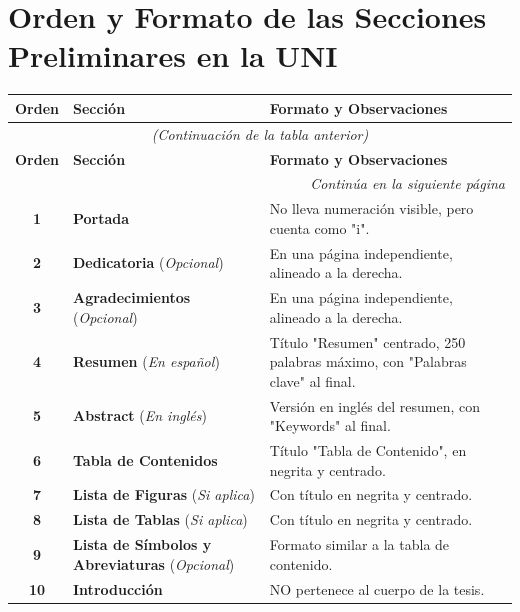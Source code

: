 \documentclass{report}
\newcommand{\greencheck}{{\color{green}\ding{51}}} %
\begin{document}
\section*{\color{red}Orden y Formato de las Secciones Preliminares en la UNI \greencheck}

\begin{longtable}{|c|l|p{8cm}|}
    \hline
    \textbf{Orden} & \textbf{Sección} & \textbf{Formato y Observaciones} \\ \hline
    \endfirsthead

    \multicolumn{3}{c}{{\textit{(Continuación de la tabla anterior)}}} \\ \hline
    \textbf{Orden} & \textbf{Sección} & \textbf{Formato y Observaciones} \\ \hline
    \endhead

    \hline \multicolumn{3}{|r|}{{\textit{Continúa en la siguiente página}}} \\ \hline
    \endfoot

    \hline
    \endlastfoot

    \textbf{1} & \textbf{Portada} & No lleva numeración visible, pero cuenta como "i". \\ \hline

    \textbf{2} & \textbf{Dedicatoria} (\textit{Opcional}) & En una página independiente, alineado a la derecha. \\ \hline

    \textbf{3} & \textbf{Agradecimientos} (\textit{Opcional}) & En una página independiente, alineado a la derecha. \\ \hline

    \textbf{4} & \textbf{Resumen} (\textit{En español}) & Título "Resumen" centrado, 250 palabras máximo, con "Palabras clave" al final. \\ \hline

    \textbf{5} & \textbf{Abstract} (\textit{En inglés}) & Versión en inglés del resumen, con "Keywords" al final. \\ \hline

    \textbf{6} & \textbf{Tabla de Contenidos} & Título "Tabla de Contenido", en negrita y centrado. \\ \hline

    \textbf{7} & \textbf{Lista de Figuras} (\textit{Si aplica}) & Con título en negrita y centrado. \\ \hline

    \textbf{8} & \textbf{Lista de Tablas} (\textit{Si aplica}) & Con título en negrita y centrado. \\ \hline

    \textbf{9} & \textbf{Lista de Símbolos y Abreviaturas} (\textit{Opcional}) & Formato similar a la tabla de contenido. \\ \hline

    \textbf{10} & \textbf{Introducción}  & NO pertenece al cuerpo de la tesis. \\ \hline

\end{longtable}
\end{document}
